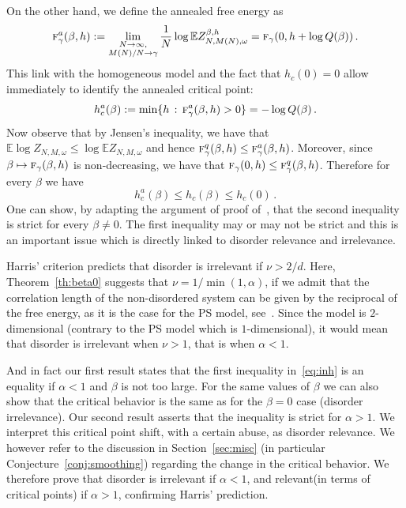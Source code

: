 \documentclass[AHL,Unicode,longabstracts]{cedram}
\newcommand{\ga}{\alpha}
\newcommand{\gb}{\beta}
\newcommand{\tf}{\textsc{f}} %
\newcommand{\bbE}{\ensuremath{\mathbb{E}}}
\newcommand{\limtwo}[2]{\lim_{\substack{#1 \\ #2}}}
\begin{document}
On the other hand, we define the annealed free energy as
\begin{equation}
\tf_\gamma^{a}(\beta,h) := \limtwo{N\to\infty,}{M(N) / N \to \gamma} \frac{1}{N} \log \bbE Z_{N,M(N),\omega}^{\gb,h} = \tf_\gamma (0, h + \log Q(\beta))\,.
\end{equation}
This link with the homogeneous model and the fact that $h_c(0)=0$ allow immediately to identify the annealed critical point:
\begin{equation}\label{eq:hann}
h_c^{a}(\beta) := \min \lbrace h\,:\,\tf^{a}_\gamma (\beta,h) >0 \rbrace = - \log Q(\beta)\,.
\end{equation}
Now observe that by Jensen's inequality, we have that $\bbE \log Z_{N,M,\omega} \le \log \bbE Z_{N,M,\omega}$ and hence $\tf_\gamma^{q}(\beta,h) \le \tf_\gamma^{a}(\beta,h)$. Moreover, since $\beta \mapsto \tf_\gamma (\beta,h)$ is non-decreasing, we have that $\tf_\gamma (0,h) \le \tf^{q}_\gamma (\beta,h) $. Therefore for every $\beta$ we have
\begin{equation}\label{eq:inh}
h_c^{a}(\beta)\le h_c(\beta) \le h_c(0)\,.
\end{equation}
One can show, by adapting the argument of proof of~\cite[Theorem~5.2]{cf:G}, that the second inequality is strict for every $\gb \neq 0$. The first inequality may or may not be strict and this is an important issue which is directly linked to disorder relevance and irrelevance.


Harris' criterion predicts that disorder is irrelevant if $\nu>2/d$. Here, Theorem~\ref{th:beta0} suggests that $\nu=1/\min(1,\alpha)$, if we admit that the correlation length of the non-disordered system can be given by the reciprocal of the free energy, as it is the case for the PS model, see~\cite{cf:G08}. Since the model is $2$-dimensional (contrary to the PS model which is $1$-dimensional), it would mean that disorder is irrelevant when $\nu>1$, that is when $\ga<1$.



And in fact our first result states that the first inequality in~\eqref{eq:inh} is an equality if $\ga<1$ and $\gb$ is not too large. For the same values of $\gb$ we can also show that the critical behavior is the same as for the $\gb=0$ case (disorder irrelevance). Our second result asserts that the inequality is strict for $\ga>1$. We interpret this critical point shift, with a certain abuse, as disorder relevance. We however refer to the discussion in Section~\ref{sec:misc} (in particular Conjecture~\ref{conj:smoothing}) regarding the change in the critical behavior. We therefore prove that disorder is irrelevant if $\ga<1$, and relevant\linebreak(in terms of critical points) if $\ga>1$, confirming Harris' prediction.
\end{document}
